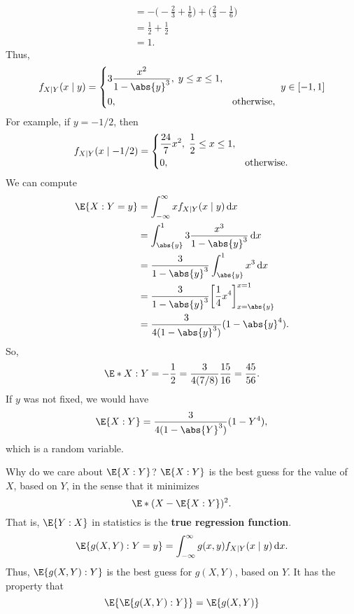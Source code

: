 \begin{Example}{}{}
\begin{align*}
         & =-\biggl(-\frac{2}{3}+\frac{1}{6}\biggr)+\biggl(\frac{2}{3}-\frac{1}{6}  \biggr)                              \\
         & =\frac{1}{2}+\frac{1}{2}                                                                                      \\
         & =1.
    \end{align*}
    Thus,
    \[ f_{X\mid Y}(x\mid y)=\begin{dcases}
            3 \frac{x^2}{1-\abs{y}^3},\; y\le x\le 1, \\
            0, & \text{otherwise},
        \end{dcases}\; y\in[-1,1] \]
    For example, if $ y=-1/2 $, then
    \[ f_{X\mid Y}(x\mid -1/2)=\begin{dcases}
            \frac{24}{7}x^2,\; \frac{1}{2}\le x\le 1, \\
            0, & \text{otherwise}.
        \end{dcases} \]
    We can compute
    \begin{align*}
        \E{X\given Y=y}
         & =\int_{-\infty}^{\infty}x f_{X\mid Y}(x\mid y)\odif{x}               \\
         & =\int_{\abs{y}}^{1}3 \frac{x^3}{1-\abs{y}^3}\odif{x}                 \\
         & =\frac{3}{1-\abs{y}^3}\int_{\abs{y}}^{1}x^3\odif{x}                  \\
         & =\frac{3}{1-\abs{y}^3}\biggl[\frac{1}{4}x^4\biggr]_{x=\abs{y}}^{x=1} \\
         & =\frac{3}{4(1-\abs{y}^3)}(1-\abs{y}^4).
    \end{align*}
    So,
    \[ \E*{X\given Y=-\frac{1}{2}}=\frac{3}{4(7/8)}\frac{15}{16}=\frac{45}{56}. \]
    If $ y $ was not fixed, we would have
    \[ \E{X\given Y}=\frac{3}{4(1-\abs{Y}^3)}(1-Y^4), \]
    which is a random variable.
    \begin{Remark}{Why do we care about $ \E{X\given Y} $?}{}
        $ \E{X\given Y} $ is the best guess for the value of $ X $,
        based on $ Y $, in the sense that it minimizes
        \[ \E*{(X-\E{X\given Y})^2}. \]
        That is, $ \E{Y\given X} $ in statistics is the
        \textbf{true regression function}.
        \tcblower{}
        \[ \E{g(X,Y)\given Y=y}=\int_{-\infty}^{\infty}g(x,y)f_{X\mid Y}(x\mid y)\odif{x}. \]
        Thus, $ \E{g(X,Y)\given Y} $
        is the best guess for $ g(X,Y) $, based on $ Y $. It has the property that
        \[ \E{\E{g(X,Y)\given Y}}=\E{g(X,Y)} \]
    \end{Remark}
\end{Example}
